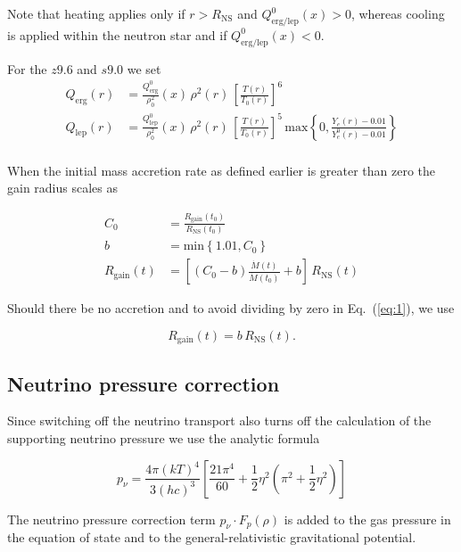 \documentclass[fleqn,usenatbib]{mnras}
\begin{document}
Note that heating applies only if $r > R_\mathrm{NS}$ and $Q_\mathrm{erg/lep}^0 (x) > 0$, whereas cooling is applied within the neutron star and if $Q_\mathrm{erg/lep}^0 (x) < 0$.

For the $z9.6$ and $s9.0$ we set
\begin{align}
    Q_\mathrm{erg}(r) &= \frac{Q_\mathrm{erg}^0}{\rho_0^2}(x) \,\rho^2 (r)
    \,\left[\frac{T(r)}{T_0(r)}\right]^6 \\
    Q_\mathrm{lep}(r) &= \frac{Q_\mathrm{lep}^0}{\rho_0^2}(x) \,\rho^2 (r)
    \,\left[\frac{T(r)}{T_0(r)}\right]^5 \, \mathrm{max}\left\{0, \frac{Y_e(r) -
    0.01}{Y_e^0(r) - 0.01}\right\} \\
\end{align}


When the initial mass accretion rate as defined earlier is greater than zero the gain radius scales as

\begin{align}
    C_0 &= \frac{R_\mathrm{gain}(t_0)}{R_\mathrm{NS}(t_0)} \\
    b &= \mathrm{min} \left\{1.01, C_0 \right\} \\
    R_\mathrm{gain}(t) &= \left[ \left( C_0 - b \right)
    \frac{\dot{M}(t)}{\dot{M}(t_0)} + b \right] \,R_\mathrm{NS}(t)
    \label{eq:1}
\end{align}

Should there be no accretion and to avoid dividing by zero in Eq.~(\ref{eq:1}),  we use

\begin{equation}
    R_\mathrm{gain}(t) = b \, R_\mathrm{NS}(t).
\end{equation}

\subsection{Neutrino pressure correction}

Since switching off the neutrino transport also turns off the calculation of the supporting neutrino pressure we use the analytic formula

\begin{equation}
    p_{\nu} = \frac{4 \pi (k T)^4}{3 (h c)^3} \left[ \frac{21
    \pi^4}{60} + \frac{1}{2} \eta^2 \left( \pi^2 + \frac{1}{2} \eta^2 \right)
    \right]
\end{equation}

The neutrino pressure correction  term $p_{\nu} \cdot F_p(\rho)$ is added to the gas pressure in the equation of state and to the general-relativistic gravitational potential.
\end{document}
